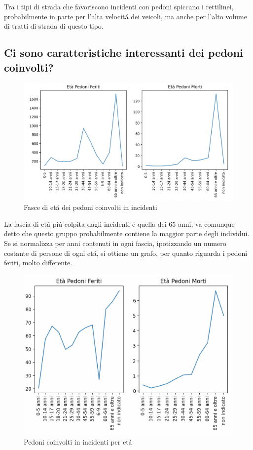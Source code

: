 \documentclass[a4paper]{report}
\begin{document}
Tra i tipi di strada che favoriscono incidenti con pedoni spiccano i rettilinei, 
probabilmente in parte per l'alta velocit\'a dei veicoli, ma anche per l'alto volume di
tratti di strada di questo tipo.


\newpage
\subsection{Ci sono caratteristiche interessanti dei pedoni coinvolti?}

\begin{figure}[!ht]
    \includegraphics[width=\linewidth]{../src/incidenti/incidenti_senza_coords/pedoni/eta_pedoni.png}
    \caption{Fasce di et\'a dei pedoni coinvolti in incidenti}
    \label{fig:eta_pedoni}
\end{figure}

La fascia di et\'a pi\'u colpita dagli incidenti \'e quella dei 65 anni, 
va comunque detto che questo gruppo probabilmente contiene la maggior parte degli individui.
Se si normalizza per anni contenuti in ogni fascia, ipotizzando un numero
costante di persone di ogni et\'a, si ottiene un grafo, per quanto riguarda i pedoni 
feriti, molto differente. 

\begin{figure}[!ht]
    \includegraphics[width=\linewidth]{../src/incidenti/incidenti_senza_coords/pedoni/eta_pedoni_norm.png}
    \caption{Pedoni coinvolti in incidenti per et\'a}
    \label{fig:sesso_morti_feriti}
\end{figure}
\end{document}
